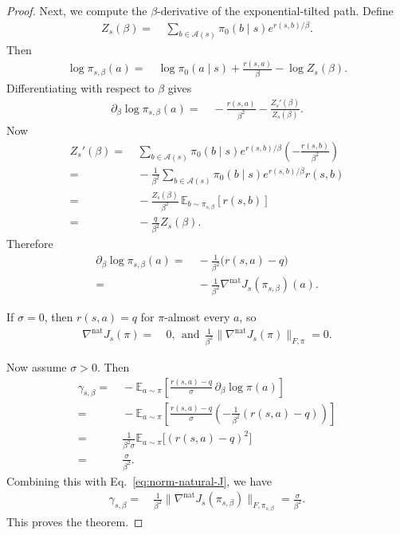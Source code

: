 \begin{proof}
Next, we compute the $\beta$-derivative of the exponential-tilted path. Define
\begin{align*}
Z_s(\beta)= &~ \sum_{b\in\mathcal{A}(s) }\pi_0(b\mid s)e^{r(s,b)/\beta}.
\end{align*}
Then
\begin{align*}
\log \pi_{s,\beta}(a)
= &~ \log \pi_0(a\mid s) + \frac{r(s,a)}{\beta} - \log Z_s(\beta).
\end{align*}
Differentiating with respect to $\beta$ gives
\begin{align*}
\partial_\beta \log \pi_{s,\beta}(a)
= &~ -\frac{r(s,a)}{\beta^2} - \frac{Z_s'(\beta)}{Z_s(\beta)}.
\end{align*}
Now
\begin{align*}
Z_s'(\beta)
= &~ \sum_{b\in\mathcal{A}(s) }\pi_0(b\mid s)e^{r(s,b)/\beta}\left(-\frac{r(s,b)}{\beta^2}\right) \\
= &~ -\frac{1}{\beta^2}\sum_{b\in\mathcal{A}(s) }\pi_0(b\mid s)e^{r(s,b)/\beta}r(s,b) \\
= &~ -\frac{Z_s(\beta)}{\beta^2}\,\mathbb E_{b\sim\pi_{s,\beta}}[r(s,b)] \\
= &~ -\frac{q}{\beta^2}Z_s(\beta).
\end{align*}
Therefore
\begin{align*}
\partial_\beta \log \pi_{s,\beta}(a)
= &~ -\frac{1}{\beta^2}\bigl(r(s,a)-q\bigr) \\
= &~ -\frac{1}{\beta^2}\nabla^{\mathrm{nat}}J_s(\pi_{s,\beta})(a).
\end{align*}

If $\sigma=0$, then $r(s,a)=q$ for $\pi$-almost every $a$, so
\begin{align*}
\nabla^{\mathrm{nat}}J_s(\pi)= &~ 0, ~~\text{and}~~ \frac{1}{\beta^2}\bigl\|\nabla^{\mathrm{nat}}J_s(\pi)\bigr\|_{F,\pi}= 0.
\end{align*}

Now assume $\sigma>0$. Then
\begin{align*}
\gamma_{s,\beta}
= &~ -\mathbb E_{a\sim\pi}
\left[
\frac{r(s,a)-q}{\sigma}\,\partial_\beta \log \pi(a)
\right] \\
= &~ -\mathbb E_{a\sim\pi}
\left[
\frac{r(s,a)-q}{\sigma}\left(-\frac{1}{\beta^2}(r(s,a)-q)\right)
\right] \\
= &~ \frac{1}{\beta^2\sigma}\mathbb E_{a\sim\pi}\bigl[(r(s,a)-q)^2\bigr] \\
= &~ \frac{\sigma}{\beta^2}.
\end{align*}
Combining this with Eq.~\eqref{eq:norm-natural-J}, we have
\begin{align*}
\gamma_{s,\beta}
= &~ \frac{1}{\beta^2}\bigl\|\nabla^{\mathrm{nat}}J_s(\pi_{s,\beta})\bigr\|_{F,\pi_{s,\beta}} = \frac{\sigma}{\beta^2}.
\end{align*}
This proves the theorem.
\end{proof}


